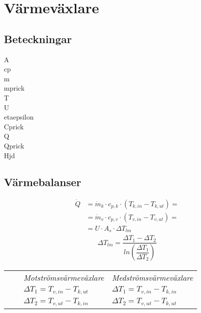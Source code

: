 \chapter{Värmeväxlare}
\section*{Beteckningar}

\acrfull{A} \\
\acrfull{cp} \\
\acrfull{m} \\
\acrfull{mprick} \\
\acrfull{T} \\
\acrfull{U} \\
\acrfull{etaepsilon} \\
\acrfull{Cprick} \\
\acrfull{Q} \\
\acrfull{Qprick} \\
\acrfull{Hjd}

\section*{Värmebalanser}
	\begin{align*}
		\dot{Q}&=\dot{m}_k\cdot c_{p,k}\cdot (T_{k,in}-T_{k,ut}) = \\
		       &=\dot{m}_v\cdot c_{p,v}\cdot (T_{v,in}-T_{v,ut}) = \\
		       &=U \cdot A_s \cdot \Delta T_{lm} 
	\end{align*}
	\begin{align*}
	\Delta T_{lm} = \dfrac{\Delta T_1 - \Delta T_2}{ln \left( \dfrac{\Delta T_1}{\Delta T_2}\right)}
	\end{align*}
	\begin{tabular}{l l l l}
    &&\textit{Motströmsvärmeväxlare} & \textit{Medströmsvärmeväxlare} \\
    &&$\Delta T_1 = T_{v,in} - T_{k,ut}$ & $\Delta T_1 = T_{v,in} - T_{k,in}$ \\
    &&$\Delta T_2 = T_{v,ut} - T_{k,in}$ & $\Delta T_2 = T_{v,ut} - T_{k,ut}$ \\
	\end{tabular}
